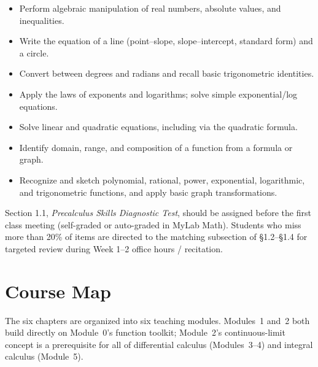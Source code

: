 \documentclass[11pt]{article}
\begin{document}
\begin{itemize}
\item Perform algebraic manipulation of real numbers, absolute values, and inequalities.
\item Write the equation of a line (point--slope, slope--intercept, standard form) and a circle.
\item Convert between degrees and radians and recall basic trigonometric identities.
\item Apply the laws of exponents and logarithms; solve simple exponential/log equations.
\item Solve linear and quadratic equations, including via the quadratic formula.
\item Identify domain, range, and composition of a function from a formula or graph.
\item Recognize and sketch polynomial, rational, power, exponential, logarithmic,
      and trigonometric functions, and apply basic graph transformations.
\end{itemize}

\begin{tcolorbox}[enhanced, colback=soft, colframe=secondary, arc=2pt, boxrule=0.5pt,
  title={\bfseries Built-in Diagnostic}, fonttitle=\bfseries, coltitle=white, colbacktitle=secondary]
Section 1.1, \emph{Precalculus Skills Diagnostic Test}, should be assigned before the first
class meeting (self-graded or auto-graded in MyLab Math). Students who miss more than
20\% of items are directed to the matching subsection of \S1.2--\S1.4 for targeted review
during Week 1--2 office hours / recitation.
\end{tcolorbox}

\section{Course Map}

The six chapters are organized into six teaching modules. Modules~1 and~2 both build
directly on Module~0's function toolkit; Module~2's continuous-limit concept is a
prerequisite for all of differential calculus (Modules~3--4) and integral calculus
(Module~5).
\end{document}
